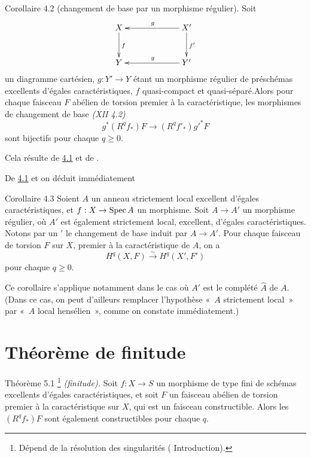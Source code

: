 \documentclass[10pt]{../fichiers-configuration-latex/smfart}
\begin{document}
\begin{enonce*}{Corollaire 4.2}
(changement de base par un morphisme régulier). Soit
$$
\xymatrix@C=2.25cm@R=1cm{
X \ar[d]^{f}& X'\ar[l]_{g} \ar[d]^{f'}\\
Y & Y'\ar[l]_{g}
}
$$
un diagramme cartésien, $g:Y'\rightarrow Y$ étant un morphisme
régulier de préschémas excellents d'égales caractéristiques, $f$
quasi-compact et quasi-séparé.\pageoriginale Alors pour chaque
faisceau $F$ abélien de torsion premier à la caractéristique, les
morphismes de changement de base \emph{(XII 4.2)}
$$
g^{\ast}(R^{q}f_{\ast})F\longrightarrow (R^{q}f'_{\ast}){g'}^{\ast}F
$$
sont bijectifs pour chaque $q\geq 0$.
\end{enonce*}

Cela résulte de \hyperref[XIX.thm4.1]{4.1} et de .

De \hyperref[XIX.thm4.1]{4.1} et  on déduit immédiatement

\begin{enonce*}{Corollaire 4.3}
Soient $A$ un anneau strictement local excellent d'égales
caractéristiques, et $f:X\rightarrow \operatorname{Spec} A$ un morphisme. Soit
$A\rightarrow A'$ un morphisme régulier, où $A'$ est également
strictement local, excellent, d'égales caractéristiques. Notons par un
$'$ le changement de base induit par $A\rightarrow A'$. Pour chaque
faisceau de torsion $F$ sur $X$, premier à la caractéristique de $A$,
on a
$$
H^{q}(X,F)\xrightarrow{\sim} H^{q}(X',F')
$$
pour chaque $q\geq 0$.
\end{enonce*}

Ce corollaire s'applique notamment dans le cas où $A'$ est le complété
$\hat{A}$ de $A$. (Dans ce cas, on peut d'ailleurs remplacer
l'hypothèse « $A$ strictement local » par « $A$ local
hensélien », comme on constate immédiatement.)

\section{Théorème de finitude}\pageoriginale

\begin{enonce*}{Théorème 5.1}
\footnote[1]{Dépend de la résolution des singularités (\cf
Introduction).} \emph{(finitude).} Soit $f:X\rightarrow S$ un
morphisme de type fini de schémas excellents d'égales
caractéristiques, et soit $F$ un faisceau abélien de torsion premier à
la caractéristique sur $X$, qui est un faisceau constructible. Alors
les $(R^{q}f_{\ast})F$ sont également constructibles pour chaque $q$.
\end{enonce*}
\end{document}
